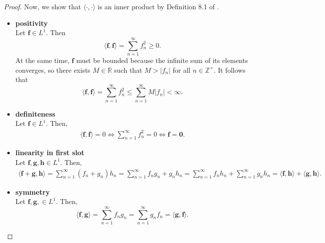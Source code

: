 \begin{proof}
    Now, we show that $\langle \cdot , \cdot \rangle$ is an inner product by Definition 8.1 of \cite{axler2020}.
    \begin{itemize}
        \item \textbf{positivity}\\
            Let $\mathbf{f} \in L^1$.
            Then
            \begin{equation*}
                \langle \mathbf{f}, \mathbf{f} \rangle
                = \sum\limits_{n=1}^{\infty} f_n^2
                \geq 0.
            \end{equation*}
            At the same time, $\mathbf{f}$ must be bounded because the infinite sum of its elements converges, so there exists $M \in \mathbb{R}$ such that $M > \lvert f_n \rvert$ for all $n \in \mathbb{Z}^{+}$.
            It follows that
            \begin{equation*}
                \langle \mathbf{f}, \mathbf{f} \rangle
                = \sum\limits_{n=1}^{\infty} f_n^2
                \leq \sum\limits_{n=1}^{\infty}
                M \lvert f_n \rvert < \infty.
            \end{equation*}

        \item \textbf{definiteness} \\ Let $\mathbf{f} \in L^1$.
            Then,
            \begin{align*}
                \langle \mathbf{f}, \mathbf{f} \rangle = 0
                \iff
                \sum\limits_{n=1}^{\infty} f_n^2 = 0
                \iff
                \mathbf{f} = \mathbf{0}.
            \end{align*}

        \item \textbf{linearity in first slot} \\
            Let $\mathbf{f}, \mathbf{g}, \mathbf{h} \in L^1$.
            Then,
            \begin{align*}
                \langle \mathbf{f} + \mathbf{g}, \mathbf{h} \rangle
                = \sum\limits_{n=1}^{\infty} (f_n + g_n)h_n
                = \sum\limits_{n=1}^{\infty} f_ng_n + g_nh_n
                = \sum\limits_{n=1}^{\infty} f_nh_n +\sum\limits_{n=1}^{\infty} g_nh_n
                = \langle \mathbf{f}, \mathbf{h} \rangle + \langle \mathbf{g}, \mathbf{h} \rangle.
            \end{align*}

        \item \textbf{symmetry} \\
            Let $\mathbf{f}, \mathbf{g}, \in L^1$.
            Then,
            \begin{equation*}
                \langle \mathbf{f}, \mathbf{g} \rangle
                = \sum\limits_{n=1}^{\infty} f_ng_n
                = \sum\limits_{n=1}^{\infty} g_nf_n
                = \langle \mathbf{g}, \mathbf{f} \rangle.
            \end{equation*}
    \end{itemize}
\end{proof}

